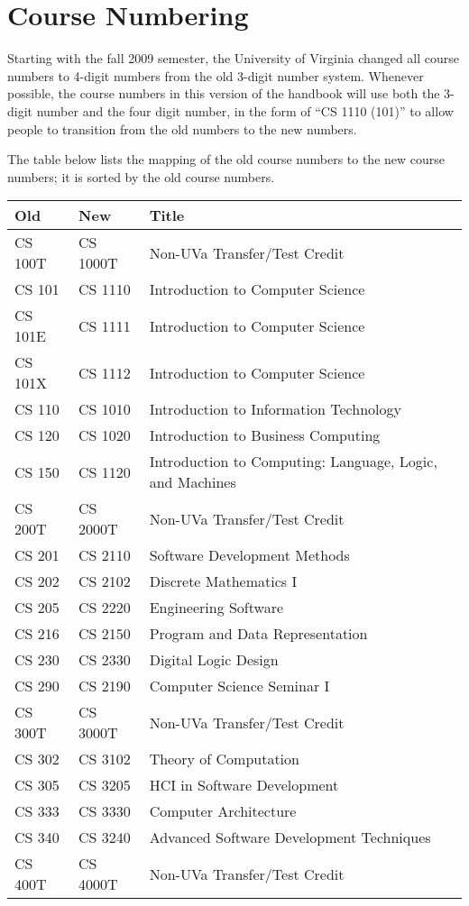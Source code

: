 \documentclass[10pt,letter]{book}
\newcommand{\mysection}[1]{\section{#1}\renewcommand{\rightmark}{#1}}
\begin{document}
\mysection{Course Numbering}

Starting with the fall 2009 semester, the University of Virginia
changed all course numbers to 4-digit numbers from the old 3-digit
number system. Whenever possible, the course numbers in this version
of the handbook will use both the 3-digit number and the four digit
number, in the form of ``CS 1110 (101)'' to allow people to transition
from the old numbers to the new numbers.

The table below lists the mapping of the old course numbers to the new
course numbers; it is sorted by the old course numbers.

\begin{tabular}{llp{2.5in}} \hline
\bf Old & \bf New & \bf Title \\ \hline
CS 100T & CS 1000T & Non-UVa Transfer/Test Credit \\
CS 101 & CS 1110 & Introduction to Computer Science \\
CS 101E & CS 1111 & Introduction to Computer Science \\
CS 101X & CS 1112 & Introduction to Computer Science \\
CS 110 & CS 1010 & Introduction to Information Technology \\
CS 120 & CS 1020 & Introduction to Business Computing \\
CS 150 & CS 1120 & Introduction to Computing: Language, Logic, and
Machines \\
CS 200T & CS 2000T & Non-UVa Transfer/Test Credit \\
CS 201 & CS 2110 & Software Development Methods \\
CS 202 & CS 2102 & Discrete Mathematics I \\
CS 205 & CS 2220 & Engineering Software \\
CS 216 & CS 2150 & Program and Data Representation \\
CS 230 & CS 2330 & Digital Logic Design \\
CS 290 & CS 2190 & Computer Science Seminar I \\
CS 300T & CS 3000T & Non-UVa Transfer/Test Credit \\
CS 302 & CS 3102 & Theory of Computation \\
CS 305 & CS 3205 & HCI in Software Development \\
CS 333 & CS 3330 & Computer Architecture \\
CS 340 & CS 3240 & Advanced Software Development Techniques \\
CS 400T & CS 4000T & Non-UVa Transfer/Test Credit \\

\end{tabular}
\end{document}
